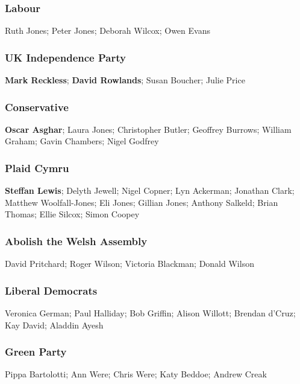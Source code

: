\begin{resultsiii}

\subsubsection*{Labour}

Ruth Jones; Peter Jones; Deborah Wilcox; Owen Evans

\subsubsection*{UK Independence Party}

\textbf{Mark Reckless}; \textbf{David Rowlands}; Susan Boucher; Julie Price

\subsubsection*{Conservative}

\textbf{Oscar Asghar}; Laura Jones; Christopher Butler; Geoffrey Burrows; William Graham; Gavin Chambers; Nigel Godfrey

\subsubsection*{Plaid Cymru}

\textbf{Steffan Lewis}; Delyth Jewell; Nigel Copner; Lyn Ackerman; Jonathan Clark; Matthew Woolfall-Jones; Eli Jones; Gillian Jones; Anthony Salkeld; Brian Thomas; Ellie Silcox; Simon Coopey

\subsubsection*{Abolish the Welsh Assembly}

David Pritchard; Roger Wilson; Victoria Blackman; Donald Wilson

\subsubsection*{Liberal Democrats}

Veronica German; Paul Halliday; Bob Griffin; Alison Willott; Brendan d'Cruz; Kay David; Aladdin Ayesh

\subsubsection*{Green Party}

Pippa Bartolotti; Ann Were; Chris Were; Katy Beddoe; Andrew Creak


\end{resultsiii}
